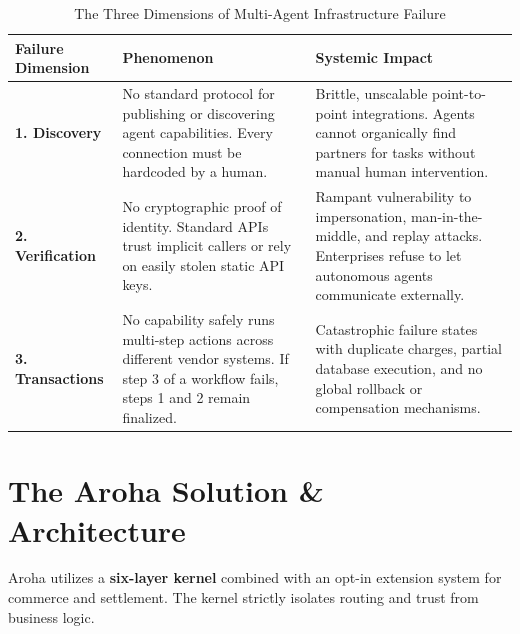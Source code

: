 \documentclass[11pt,a4paper]{article}
\begin{document}
\begin{table}[h]
    \centering
    \renewcommand{\arraystretch}{1.5}
    \begin{tabularx}{\textwidth}{@{} >{\bfseries}p{3cm} p{5.5cm} X @{}}
        \toprule
        Failure Dimension & Phenomenon & Systemic Impact \\
        \midrule
        1. Discovery & No standard protocol for publishing or discovering agent capabilities. Every connection must be hardcoded by a human. & Brittle, unscalable point-to-point integrations. Agents cannot organically find partners for tasks without manual human intervention. \\
        2. Verification & No cryptographic proof of identity. Standard APIs trust implicit callers or rely on easily stolen static API keys. & Rampant vulnerability to impersonation, man-in-the-middle, and replay attacks. Enterprises refuse to let autonomous agents communicate externally. \\
        3. Transactions & No capability safely runs multi-step actions across different vendor systems. If step 3 of a workflow fails, steps 1 and 2 remain finalized. & Catastrophic failure states with duplicate charges, partial database execution, and no global rollback or compensation mechanisms. \\
        \bottomrule
    \end{tabularx}
    \caption{The Three Dimensions of Multi-Agent Infrastructure Failure}
\end{table}

\section{The Aroha Solution \& Architecture}
Aroha utilizes a \textbf{six-layer kernel} combined with an opt-in extension system for commerce and settlement. The kernel strictly isolates routing and trust from business logic.
\end{document}
